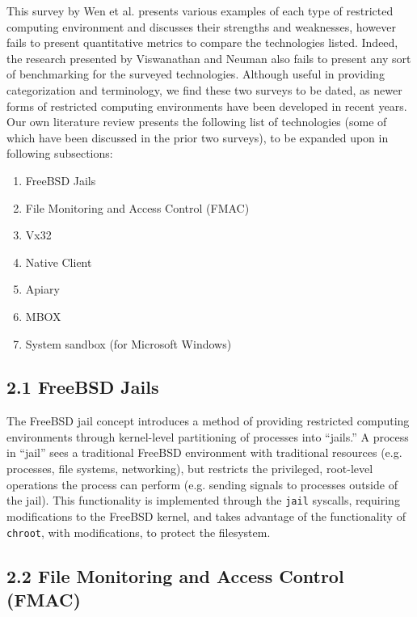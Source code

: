 \documentclass{proc}
\begin{document}
This survey by Wen et al. presents various examples of each type of restricted computing environment and discusses their strengths and weaknesses, however fails to present quantitative metrics to compare the technologies listed. Indeed, the research presented by Viswanathan and Neuman \cite{viswanathan2009isolation} also fails to present any sort of benchmarking for the surveyed technologies.
\newline\newline
Although useful in providing categorization and terminology, we find these two surveys to be dated, as newer forms of restricted computing environments have been developed in recent years. Our own literature review presents the following list of technologies (some of which have been discussed in the prior two surveys), to be expanded upon in following subsections:
\begin{enumerate}
    \item FreeBSD Jails \cite{kamp2000jails}
    \item File Monitoring and Access Control (FMAC) \cite{prevelakis2001fmac}
    \item Vx32 \cite{ford2008vx32}
    \item Native Client \cite{yee2009native}
    \item Apiary \cite{potter2010apiary}
    \item MBOX \cite{kim2013mbox}
    \item System sandbox (for Microsoft Windows) \cite{vokorokos2015sandboxMSWIN}
\end{enumerate}

\subsection*{2.1 FreeBSD Jails}

The FreeBSD jail concept \cite{kamp2000jails} introduces a method of providing restricted computing environments through kernel-level partitioning of processes into ``jails.'' A process in ``jail'' sees a traditional FreeBSD environment with traditional resources (e.g. processes, file systems, networking), but restricts the privileged, root-level operations the process can perform (e.g. sending signals to processes outside of the jail). This functionality is implemented through the \texttt{jail} syscalls, requiring modifications to the FreeBSD kernel, and takes advantage of the functionality of \texttt{chroot}, with modifications, to protect the filesystem.

\subsection*{2.2 File Monitoring and Access Control (FMAC)}
\end{document}
